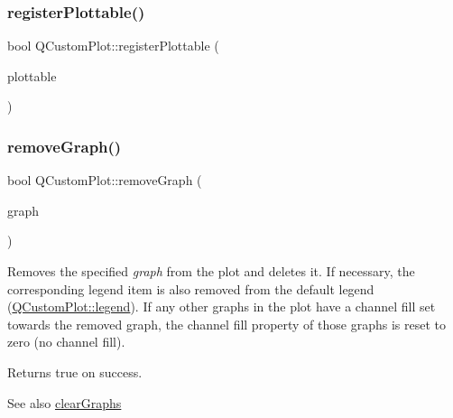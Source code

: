 \subsubsection{\texorpdfstring{registerPlottable()}{registerPlottable()}}
{\footnotesize\ttfamily bool Q\+Custom\+Plot\+::register\+Plottable (\begin{DoxyParamCaption}\item[{\mbox{\hyperlink{class_q_c_p_abstract_plottable}{Q\+C\+P\+Abstract\+Plottable}} $\ast$}]{plottable }\end{DoxyParamCaption})\hspace{0.3cm}{\ttfamily [protected]}}

\mbox{\label{class_q_custom_plot_a903561be895fb6528a770d66ac5e6713}} 
\subsubsection{\texorpdfstring{removeGraph()}{removeGraph()}\hspace{0.1cm}{\footnotesize\ttfamily [1/2]}}
{\footnotesize\ttfamily bool Q\+Custom\+Plot\+::remove\+Graph (\begin{DoxyParamCaption}\item[{\mbox{\hyperlink{class_q_c_p_graph}{Q\+C\+P\+Graph}} $\ast$}]{graph }\end{DoxyParamCaption})}

Removes the specified {\itshape graph} from the plot and deletes it. If necessary, the corresponding legend item is also removed from the default legend (\mbox{\hyperlink{class_q_custom_plot_a4eadcd237dc6a09938b68b16877fa6af}{Q\+Custom\+Plot\+::legend}}). If any other graphs in the plot have a channel fill set towards the removed graph, the channel fill property of those graphs is reset to zero (no channel fill).

Returns true on success.

\begin{DoxySeeAlso}{See also}
\mbox{\hyperlink{class_q_custom_plot_ab0f3abff2d2f7df3668b5836f39207fa}{clear\+Graphs}} 
\end{DoxySeeAlso}
\mbox{\label{class_q_custom_plot_a9554b3d2d5b10c0f884bd4010b6c192c}} 

